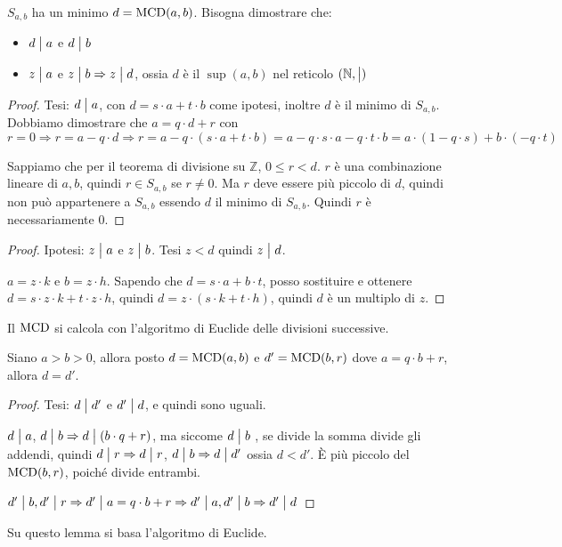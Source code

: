 $S_{a,b}$ ha un minimo $d = \operatorname{MCD}(a,b)$. Bisogna dimostrare che:
\begin{itemize}
    \item $d \bigm| a$ e $d \bigm| b$
    \item $z \bigm| a$ e $z \bigm| b \Rightarrow z \bigm| d$, ossia $d$ \`e il $\sup(a,b)$ nel reticolo $(\mathbb{N}, \bigm|)$
\end{itemize}
\begin{proof}

Tesi: $d \bigm| a$, con $d = s \cdot a + t \cdot b$ come ipotesi, inoltre $d$ \`e il minimo di $S_{a,b}$. Dobbiamo dimostrare che $a = q \cdot d + r$ con $r = 0 \Rightarrow r = a - q \cdot d \Rightarrow r = a - q \cdot (s \cdot a + t \cdot b) = a - q \cdot s \cdot a - q \cdot t \cdot b = a \cdot (1 - q \cdot s) + b \cdot (- q \cdot t)$

Sappiamo che per il teorema di divisione su $\mathbb{Z}$, $0 \le r < d$. $r$ \`e una combinazione lineare di $a, b$, quindi $r \in S_{a,b}$ se $r \neq 0$. Ma $r$ deve essere pi\`u piccolo di $d$, quindi non pu\`o appartenere a $S_{a,b}$ essendo $d$ il minimo di $S_{a,b}$. Quindi $r$ \`e necessariamente 0.
\end{proof}
\begin{proof}
Ipotesi: $z \bigm| a$ e $z \bigm| b$. Tesi $z < d$ quindi $z \bigm| d$.

$a = z \cdot k$ e $b = z \cdot h$. Sapendo che $d = s \cdot a + b \cdot t$, posso sostituire e ottenere $d = s \cdot z \cdot k + t \cdot z \cdot h$, quindi $d = z \cdot ( s \cdot k + t \cdot h)$, quindi $d$ \`e un multiplo di $z$.
\end{proof}

Il $\operatorname{MCD}$ si calcola con l'algoritmo di Euclide delle divisioni successive.

\begin{lem}
Siano $a > b > 0$, allora posto $d = \operatorname{MCD}(a,b)$ e $d' = \operatorname{MCD}(b, r)$ dove $a = q \cdot b + r$, allora $d = d'$.
\end{lem}
\begin{proof}
Tesi: $d \bigm| d'$ e $d' \bigm| d$, e quindi sono uguali.

$d \bigm| a$, $d \bigm| b \Rightarrow d \bigm| ( b \cdot q + r )$, ma siccome $d \bigm| b$ , se divide la somma divide gli addendi, quindi $d \bigm| r \Rightarrow d \bigm| r$, $d \bigm| b \Rightarrow d \bigm| d'$ ossia $d < d'$. \`E pi\`u piccolo del $\operatorname{MCD}(b, r)$, poich\'e divide entrambi.

$d' \bigm| b, d' \bigm| r \Rightarrow d' \bigm| a = q \cdot b + r \Rightarrow d' \bigm| a, d' \bigm| b \Rightarrow d' \bigm| d$
\end{proof}
Su questo lemma si basa l'algoritmo di Euclide.

